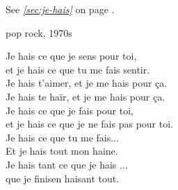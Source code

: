 

\begin{notes}
See \emph{\ref{sec:je-hais}} on page \pageref{sec:je-hais}.
\end{notes}

\begin{style}
pop rock, 1970s
\end{style}
\begin{lyrics}
Je hais ce que je sens pour toi,\\
et je hais ce que tu me fais sentir.\\
Je hais t'aimer, et je me hais pour ça.\\
Je hais te haïr, et je me hais pour ça.\\
Je hais ce que je fais pour toi,\\
et je hais ce que je ne fais pas pour toi.\\
Je hais ce que tu me fais...\\
Et je hais tout mon haine.\\
Je hais tant ce que je hais ...\\
que je finisen haisant tout.
\end{lyrics}

